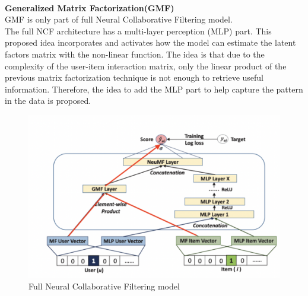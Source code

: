 \\\textbf{Generalized Matrix Factorization(GMF)}
 \\GMF is only part of full Neural Collaborative Filtering model.
 \\The full NCF architecture has a multi-layer perception (MLP) part. This proposed idea incorporates and activates how the model can estimate the latent factors matrix with the non-linear function. The idea is that due to the complexity of the user-item interaction matrix, only the linear product of the previous matrix factorization technique is not enough to retrieve useful information. Therefore, the idea to add the MLP part to help capture the pattern in the data is proposed.
 \begin{figure}[ht]
\centering
\includegraphics[scale = 0.5]{Figures/NCF}
\caption{Full Neural Collaborative Filtering model}
\end{figure}
 


